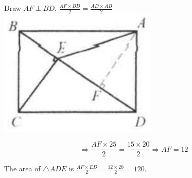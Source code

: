 \documentclass{article}
\begin{document}
Draw \(A F \perp B D\). \(\frac{A F \times B D}{2}=\frac{A D \times A B}{2}\)\\
\centering
\includegraphics[width=\textwidth]{images/095.jpg}

\[
\Rightarrow \frac{A F \times 25}{2}=\frac{15 \times 20}{2} \Rightarrow A F=12
\]

The area of \(\triangle A D E\) is \(\frac{A F \times E D}{2}=\frac{12 \times 20}{2}=120\).\\
\end{document}

